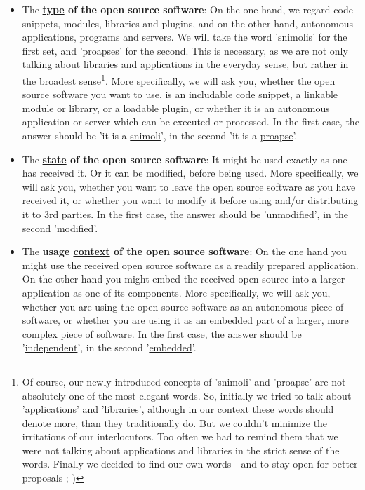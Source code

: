 \label{OsucTokens}
\begin{itemize}
  \item The \textbf{\underline{type} of the open source software}: On the one
  hand, we regard code snippets, modules, libraries and plugins, and on the
  other hand, autonomous applications, programs and servers. We will take the
  word ’snimolis’ for the first set, and ’proapses’ for the second. This is
  necessary, as we are not only talking about libraries and applications in the
  everyday sense, but rather in the broadest sense\footnote{Of course, our newly
  introduced concepts of 'snimoli' and 'proapse' are not absolutely one of the
  most elegant words. So, initially we tried to talk about 'applications' and
  'libraries', although in our context these words should denote more, than they
  traditionally do. But we couldn't minimize the irritations of our
  interlocutors. Too often we had to remind them that we were not talking about
  applications and libraries in the strict sense of the words. Finally we
  decided to find our own words---and to stay open for better proposals ;-) }.
  More specifically, we will ask you, whether the open source software you want
  to use, is an includable code snippet, a linkable module or library, or a
  loadable plugin, or whether it is an autonomous application or server which
  can be executed or processed. In the first case, the answer should be 'it is a
  \underline{snimoli}', in the second 'it is a \underline{proapse}'.

  \item The \textbf{\underline{state} of the open source software}: It might be
  used exactly as one has received it. Or it can be modified, before being used.
  More specifically, we will ask you, whether you want to leave the open source
  software as you have received it, or whether you want to modify it before
  using and/or distributing it to 3rd parties. In the first case, the answer
  should be '\underline{unmodified}', in the second '\underline{modified}'.
  
  \item The \textbf{usage \underline{context} of the open source
  software}: On the one hand you might use the received open source software as a
  readily prepared application. On the other hand you might embed the received
  open source into a larger application as one of its components. More
  specifically, we will ask you, whether you are using the open source
  software as an autonomous piece of software, or whether you are using it as an
  embedded part of a larger, more complex piece of software. In the first case,
  the answer should be '\underline{independent}', in the second
  '\underline{embedded}'.
  

\end{itemize}
